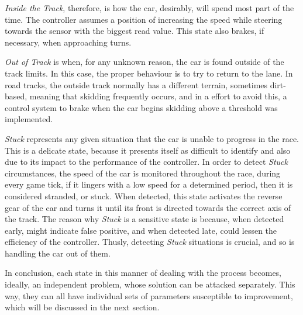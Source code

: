 	\emph{Inside the Track}, therefore, is how the car, desirably, will spend most part of the time. The controller
	assumes a position of increasing the speed while steering towards the sensor with the biggest read value. This
	state also brakes, if necessary, when approaching turns.
	
	\emph{Out of Track} is when, for any unknown reason, the car is found outside of the track limits. In this case,
	the proper behaviour is to try to return to the lane. In road tracks, the outside track normally has a different
	terrain, sometimes dirt-based, meaning that skidding frequently occurs, and in a effort to avoid this, a control
	system to brake when the car begins skidding above a threshold was implemented.
	
	\emph{Stuck} represents any given situation that the car is unable to progress in the race. This is a delicate
	state, because it presents itself as difficult to identify and also due to its impact to the performance of the
	controller. In order to detect \emph{Stuck} circumstances, the speed of the car is monitored throughout the race,
	during every game tick, if it lingers with a low speed for a determined period, then it is considered stranded,
	or stuck. When detected, this state activates the reverse gear of the car and turns it until its front is
	directed towards the correct axis of the track. The reason why \emph{Stuck} is a sensitive state is because, when
	detected early, might indicate false positive, and when detected late, could lessen the efficiency of the
	controller. Thusly, detecting \textit{Stuck} situations is crucial, and so is handling the car out of them.
	
	In conclusion, each state in this manner of dealing with the process becomes, ideally, an independent problem,
	whose solution can be attacked separately. This way, they can all have individual sets of parameters susceptible
	to improvement, which will be discussed in the next section.